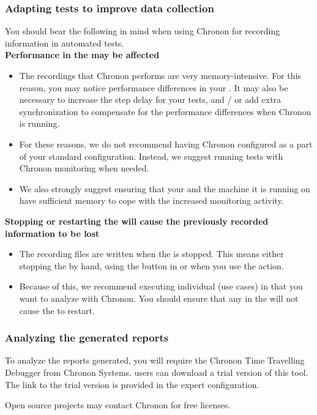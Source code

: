 \subsubsection{Adapting tests to improve data collection}
You should bear the following in mind when using Chronon for recording information in automated tests.\\

\textbf{Performance in the \gdaut{} may be affected}
\begin{itemize}
\item The recordings that Chronon performs are very memory-intensive. For this reason, you may notice performance differences in your \gdaut{}. It may also be necessary to increase the step delay for your tests, and / or add extra synchronization to compensate for the performance differences when Chronon is running. 
\item For these reasons, we do not recommend having Chronon configured as a part of your standard \gdaut{} configuration. Instead, we suggest running tests with Chronon monitoring when needed. 
\item We also strongly suggest ensuring that your \gdaut{} and the machine it is running on have sufficient memory to cope with the increased monitoring activity.
\end{itemize}

\textbf{Stopping or restarting the \gdaut{} will cause the previously recorded information to be lost}
\begin{itemize}
\item The recording files are written when the \gdaut{} is stopped. This means either stopping the \gdaut{} by hand, using the  button in \app{} or when you use the  action. 
\item Because of this, we recommend executing individual \gdcases{} (use cases) in \gdsuites{} that you want to analyze with Chronon. You should ensure that any \gdehandlers{} in the \gdsuite{} will not cause the \gdaut{} to restart.
\end{itemize}

\subsubsection{Analyzing the generated reports}
\label{TasksChrononTools}
To analyze the reports generated, you will require the Chronon Time Travelling Debugger from Chronon Systems. \app{} users can download a trial version of this tool. The link to the trial version is provided in the expert \gdaut{} configuration.

Open source projects may contact Chronon for free licenses. 


